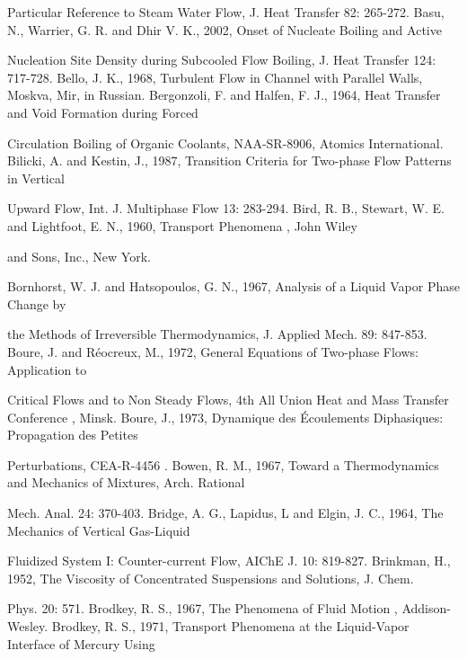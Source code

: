 \documentclass[11pt,a4paper,openany,fontset=none]{ctexbook}
\begin{document}
{\small\raggedright\noindent Particular Reference to Steam Water Flow, J. Heat Transfer 82: 265-272. Basu, N., Warrier, G. R. and Dhir V. K., 2002, Onset of Nucleate Boiling and Active\par}
{\small\raggedright\noindent Nucleation Site Density during Subcooled Flow Boiling, J. Heat Transfer 124: 717-728. Bello, J. K., 1968, Turbulent Flow in Channel with Parallel Walls, Moskva, Mir, in Russian. Bergonzoli, F. and Halfen, F. J., 1964, Heat Transfer and Void Formation during Forced\par}
{\small\raggedright\noindent Circulation Boiling of Organic Coolants, NAA-SR-8906, Atomics International. Bilicki, A. and Kestin, J., 1987, Transition Criteria for Two-phase Flow Patterns in Vertical\par}
{\small\raggedright\noindent Upward Flow, Int. J. Multiphase Flow 13: 283-294. Bird, R. B., Stewart, W. E. and Lightfoot, E. N., 1960, Transport Phenomena , John Wiley\par}
{\small\raggedright\noindent and Sons, Inc., New York.\par}
{\small\raggedright\noindent Bornhorst, W. J. and Hatsopoulos, G. N., 1967, Analysis of a Liquid Vapor Phase Change by\par}
{\small\raggedright\noindent the Methods of Irreversible Thermodynamics, J. Applied Mech. 89: 847-853. Boure, J. and Réocreux, M., 1972, General Equations of Two-phase Flows: Application to\par}
{\small\raggedright\noindent Critical Flows and to Non Steady Flows, 4th All Union Heat and Mass Transfer Conference , Minsk. Boure, J., 1973, Dynamique des Écoulements Diphasiques: Propagation des Petites\par}
{\small\raggedright\noindent Perturbations, CEA-R-4456 . Bowen, R. M., 1967, Toward a Thermodynamics and Mechanics of Mixtures, Arch. Rational\par}
{\small\raggedright\noindent Mech. Anal. 24: 370-403. Bridge, A. G., Lapidus, L and Elgin, J. C., 1964, The Mechanics of Vertical Gas-Liquid\par}
{\small\raggedright\noindent Fluidized System I: Counter-current Flow, AIChE J. 10: 819-827. Brinkman, H., 1952, The Viscosity of Concentrated Suspensions and Solutions, J. Chem.\par}
{\small\raggedright\noindent Phys. 20: 571. Brodkey, R. S., 1967, The Phenomena of Fluid Motion , Addison-Wesley. Brodkey, R. S., 1971, Transport Phenomena at the Liquid-Vapor Interface of Mercury Using\par}
\end{document}
